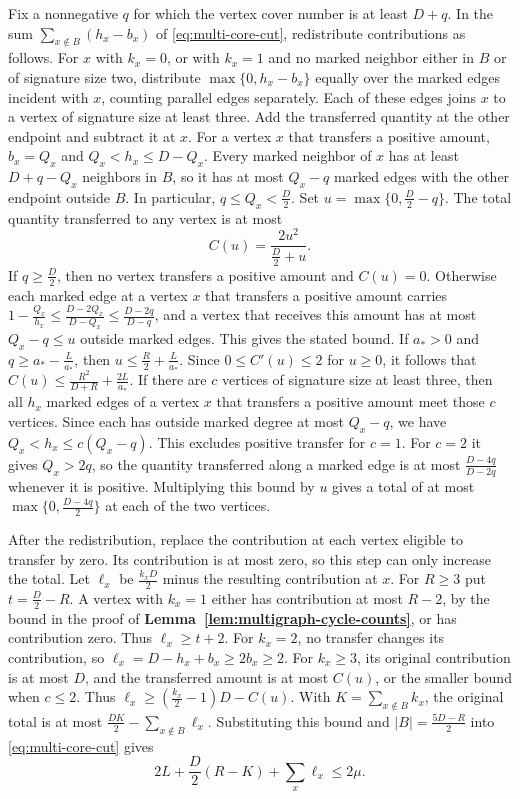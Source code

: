 \documentclass[preprint,11pt,numbers]{elsarticle-arxiv}
\numberwithin{equation}{section}
\theoremstyle{definition}
\begin{document}
Fix a nonnegative $q$ for which the vertex cover number is at least
$D+q$. In the sum $\sum_{x\notin B}(h_x-b_x)$ of
\eqref{eq:multi-core-cut}, redistribute contributions as follows.
For $x$ with $k_x=0$, or with $k_x=1$ and no marked neighbor
either in $B$ or of signature size two, distribute
$\max\{0,h_x-b_x\}$ equally over the marked edges incident with $x$,
counting parallel edges separately. Each of these edges joins $x$
to a vertex of signature size at least three. Add the transferred
quantity at the other endpoint and subtract it at $x$. For a vertex
$x$ that transfers a positive amount, $b_x=Q_x$ and
$Q_x<h_x\le D-Q_x$. Every marked neighbor of $x$ has at least
$D+q-Q_x$ neighbors in $B$, so it has at most $Q_x-q$ marked edges
with the other endpoint outside $B$. In particular,
$q\le Q_x<\frac{D}{2}$. Set $u=\max\{0,\frac{D}{2}-q\}$. The total
quantity transferred to any vertex is at most
\[
 C(u)=\frac{2u^2}{\frac{D}{2}+u}.
\]
If $q\ge\frac{D}{2}$, then no vertex transfers a positive amount
and $C(u)=0$. Otherwise each marked edge at a vertex $x$ that
transfers a positive amount carries
$1-\frac{Q_x}{h_x}\le\frac{D-2Q_x}{D-Q_x}\le\frac{D-2q}{D-q}$,
and a vertex that receives this amount has at most
$Q_x-q\le u$ outside marked edges. This gives the stated bound.
If $a_*>0$ and $q\ge a_*-\frac{L}{a_*}$, then
$u\le\frac{R}{2}+\frac{L}{a_*}$.
Since $0\le C'(u)\le2$ for $u\ge0$, it follows that
$C(u)\le\frac{R^2}{D+R}+\frac{2L}{a_*}$.
If there are $c$ vertices of signature size at least three, then all
$h_x$ marked edges of a vertex $x$ that transfers a positive amount
meet those $c$ vertices. Since each has outside marked degree at most
$Q_x-q$, we have $Q_x<h_x\le c(Q_x-q)$. This excludes positive
transfer for $c=1$. For $c=2$ it gives $Q_x>2q$, so the quantity
transferred along a marked edge is at most $\frac{D-4q}{D-2q}$
whenever it is positive. Multiplying this bound by $u$ gives a
total of at most $\max\{0,\frac{D-4q}{2}\}$ at each of the two
vertices.

After the redistribution, replace the contribution at each vertex
eligible to transfer by zero. Its contribution is at most zero,
so this step can only increase the total. Let $\ell_x$ be
$\frac{k_xD}{2}$ minus the resulting contribution at $x$. For
$R\ge3$ put $t=\frac{D}{2}-R$. A vertex with $k_x=1$ either has
contribution at most $R-2$, by the bound in the proof of
\textbf{Lemma~\ref{lem:multigraph-cycle-counts}}, or has
contribution zero. Thus $\ell_x\ge t+2$. For $k_x=2$, no transfer
changes its contribution, so $\ell_x=D-h_x+b_x\ge2b_x\ge2$.
For $k_x\ge3$, its original contribution is at most $D$, and
the transferred amount is at most $C(u)$, or the smaller bound
when $c\le2$. Thus $\ell_x\ge(\frac{k_x}{2}-1)D-C(u)$.
With $K=\sum_{x\notin B}k_x$, the original total is at most
$\frac{DK}{2}-\sum_{x\notin B}\ell_x$. Substituting this bound
and $|B|=\frac{5D-R}{2}$ into \eqref{eq:multi-core-cut} gives
\begin{equation}\label{eq:multi-loss-budget}
 2L+\frac{D}{2}(R-K)+\sum_x\ell_x\le2\mu.
\end{equation}
\end{document}

